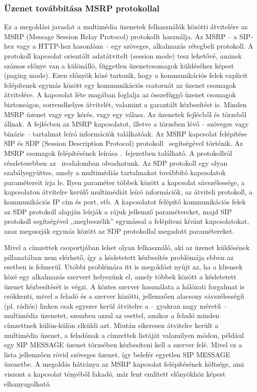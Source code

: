 \subsubsection{Üzenet továbbítása MSRP protokollal}
\label{sec:msrp_message}

Ez a megoldási javaslat a multimédia üzenetek felhasználók közötti átvitelére az MSRP (Message Session Relay Protocol) protokollt használja. Az MSRP -- a SIP-hez vagy a HTTP-hez hasonlóan -- egy szöveges, alkalmazás rétegbeli protokoll. A protokoll kapcsolat orientált adatátvitelt (session mode) tesz lehetővé, aminek számos előnye van a különálló, független üzenetcsomagok küldéséhez képest (paging mode).
Ezen előnyök közé tartozik, hogy a kommunikációs felek explicit felépítenek egymás között egy kommunikációs csatornát az üzenet csomagok átvitelére. A kapcsolat léte magában foglalja az összefüggő üzenet csomagok biztonságos, sorrendhelyes átvitelét, valamint a garantált kézbesítést is. Minden MSRP üzenet vagy egy kérés, vagy egy válasz. Az üzenetek fejlécből és törzsből állnak. A fejlécben az MSRP kapcsolatot, illetve a törzsben lévő -- szöveges vagy bináris -- tartalmat leíró információk találhatóak. Az MSRP kapcsolat felépítése SIP és SDP (Session Description Protocol) protokoll~\cite{rfc4566} segítségével történik. Az MSRP csomagok felépítésének leírása .~fejezetben található. A protokollról részletesebben az~\cite{rfc4975} irodalomban olvashatunk. Az SDP protokoll egy olyan szabályegyüttes, amely a multimédiás tartalmakat továbbító kapcsolatok paramétereit írja le. Ilyen paraméter többek között a kapcsolat sávszélessége, a kapcsolaton átvitelre kerülő multimédiát leíró információk, az átviteli protokoll, a kommunikációs IP cím és port, stb. A kapcsolatot felépítő kommunikációs felek az SDP protokoll alapján leírják a rájuk jellemző paramétereket, majd SIP protokoll segítségével ,,megbeszélik'' egymással a felépíteni kívánt kapcsolatokat, azaz megoszják egymás között az SDP protokollal megadott paramétereket. 

Mivel a címzettek csoportjában lehet olyan felhasználó, aki az üzenet küldésének pillanatában nem elérhető, így a késletetett kézbesítés problémája ebben az esetben is felmerül. Utóbbi problémára itt is megoldást nyújt az, ha a kliensek közé egy alkalmazás szervert helyezünk el, amely többek között a késletetett üzenet kézbesítését is végzi. A köztes szerver használata a hálózati forgalmat is csökkenti, mivel a feladó és a szerver közötti, jellemzően alacsony sávszélességű (pl. rádiós) linken csak egyszer kerül átvitelre a -- gyakran nagy méretű -- multimédia üzenetet, szemben azzal az esettel, amikor a feladó minden címzettnek külön-külön elküldi azt. Miután sikeresen átvitelre került a multimédia üzenet, a feladónak a címzettek listáját valamilyen módon, például egy SIP MESSAGE üzenet törzsében kézbesíteni kell a szerver felé. Mivel ez a lista jellemzően rövid szöveges üzenet, így belefér egyetlen SIP MESSAGE üzenetbe. A megoldás hátránya az MSRP kapcsolat felépítésének költsége, ami viszont a kapcsolat tényéből fakadó, már fent említett előnyökhöz képest elhanyagolható.

